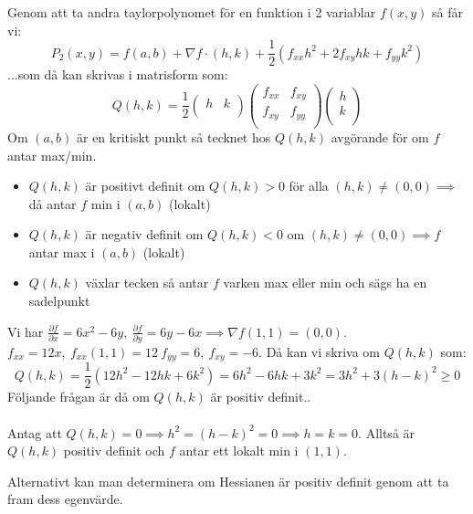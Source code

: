\documentclass{report}
\begin{document}
{
Genom att ta andra taylorpolynomet för en funktion i 2 variablar $ f(x,y) $  så får vi:
\begin{equation*}
	P_2(x,y) = f(a,b) + \nabla f \cdot (h,k) + \frac{1}{2} ( f_{xx} h^2 + 2f_{xy}hk + f_{yy}k^2) 
\end{equation*}
...som då kan skrivas i matrisform som:
\begin{equation*}
Q(h,k) =
\frac{1}{2} 
\begin{pmatrix}
	h & k \\
\end{pmatrix}
\begin{pmatrix}
	f_{xx} & f_{xy} \\
	f_{xy} & f_{yy} \\
\end{pmatrix}
\begin{pmatrix}
	h \\
	k \\
\end{pmatrix}
\end{equation*}
Om $ (a,b) $ är en kritiskt punkt så tecknet hos $ Q(h,k) $ avgörande för om $ f $ antar max/min.

\begin{itemize}
	\item $ Q(h,k) $ är positivt definit om $ Q(h,k) > 0 $ för alla $ (h,k) \ne (0,0)  \implies $ då antar $ f $ min i $ (a,b) $ (lokalt)
	\item $ Q(h,k) $ är negativ definit om $ Q(h,k) < 0 $ om $ (h,k) \ne (0,0) \implies f $ antar max i $ (a,b) $ (lokalt)
	\item $ Q(h,k) $ växlar tecken så antar $ f $ varken max eller min och sägs ha en sadelpunkt
\end{itemize}

}

\pagebreak
{}
{
	Vi har $ \frac{\partial f }{\partial x } = 6x^2-6y, \: \frac{\partial f }{\partial y } = 6y-6x \implies \nabla f(1,1) = (0,0) $. $ f_{xx} = 12x, \: f_{xx}(1,1) = 12 \: f_{yy} = 6, \: f_{xy} = -6 $. Då kan vi skriva om $ Q(h,k) $ som:
	\begin{equation*}
	Q(h,k) = \frac{1}{2} (12h^2-12hk+6k^2) = 6h^2-6hk+3k^2 = 3h^2 + 3(h-k)^2 \ge 0 
	\end{equation*} 
Följande frågan är då om $ Q(h,k) $ är positiv definit..\\\\

Antag att $ Q(h,k) = 0 \implies h^2 = (h-k)^2 = 0 \implies h = k = 0 $. Alltså är $ Q(h,k) $ positiv definit och $ f $ antar ett lokalt min i $ (1,1) $. 

Alternativt kan man determinera om Hessianen är positiv definit genom att ta fram dess egenvärde.
}
\end{document}

